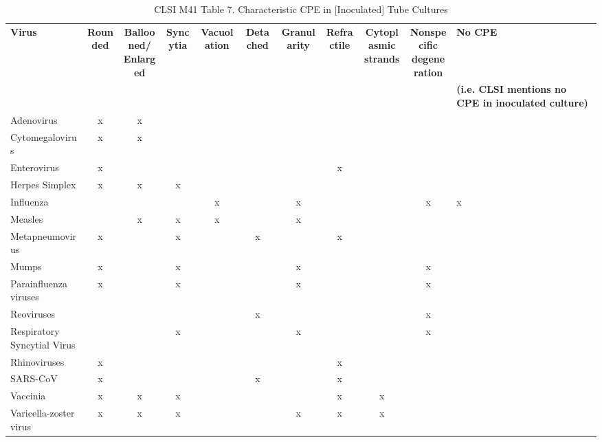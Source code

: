 \begin{table}[htbp]
\centering
\small
\caption{CLSI M41 Table 7. Characteristic CPE in [Inoculated] Tube Cultures}
\label{tab:clsi-m41-cpe}
\begin{tabular}{l *{9}{c} p{3.8cm}}
\toprule
\textbf{Virus} & \textbf{Rounded} & \textbf{Ballooned/\\Enlarged} & \textbf{Syncytia} & \textbf{Vacuolation} & \textbf{Detached} & \textbf{Granularity} & \textbf{Refractile} & \textbf{Cytoplasmic\\strands} & \textbf{Nonspecific\\degeneration} & \textbf{No CPE} \\
 &  &  &  &  &  &  &  &  &  & \textbf{(i.e. CLSI mentions no CPE in inoculated culture)} \\
\midrule
Adenovirus & x & x &  &  &  &  &  &  &  &  \\
Cytomegalovirus & x & x &  &  &  &  &  &  &  &  \\
Enterovirus & x &  &  &  &  &  & x &  &  &  \\
Herpes Simplex & x & x & x &  &  &  &  &  &  &  \\
Influenza &  &  &  & x &  & x &  &  & x & x \\
Measles &  & x & x & x &  & x &  &  &  &  \\
Metapneumovirus & x &  & x &  & x &  & x &  &  &  \\
Mumps & x &  & x &  &  & x &  &  & x &  \\
Parainfluenza viruses & x &  & x &  &  & x &  &  & x &  \\
Reoviruses &  &  &  &  & x &  &  &  & x &  \\
Respiratory Syncytial Virus &  &  & x &  &  & x &  &  & x &  \\
Rhinoviruses & x &  &  &  &  &  & x &  &  &  \\
SARS-CoV & x &  &  &  & x &  & x &  &  &  \\
Vaccinia & x & x & x &  &  &  & x & x &  &  \\
Varicella-zoster virus & x & x & x &  &  & x & x & x &  &  \\
\bottomrule
\end{tabular}
\end{table}
